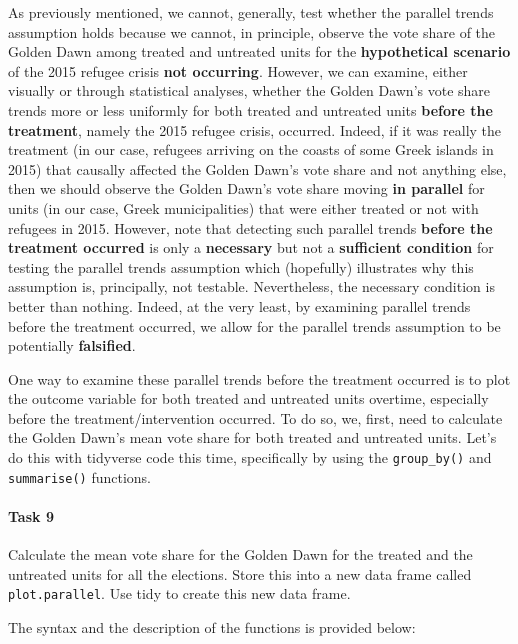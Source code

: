 \documentclass[
]{article}
\begin{document}
As previously mentioned, we cannot, generally, test whether the parallel
trends assumption holds because we cannot, in principle, observe the
vote share of the Golden Dawn among treated and untreated units for the
\textbf{hypothetical scenario} of the 2015 refugee crisis \textbf{not
occurring}. However, we can examine, either visually or through
statistical analyses, whether the Golden Dawn's vote share trends more
or less uniformly for both treated and untreated units \textbf{before
the treatment}, namely the 2015 refugee crisis, occurred. Indeed, if it
was really the treatment (in our case, refugees arriving on the coasts
of some Greek islands in 2015) that causally affected the Golden Dawn's
vote share and not anything else, then we should observe the Golden
Dawn's vote share moving \textbf{in parallel} for units (in our case,
Greek municipalities) that were either treated or not with refugees in
2015. However, note that detecting such parallel trends \textbf{before
the treatment occurred} is only a \textbf{necessary} but not a
\textbf{sufficient condition} for testing the parallel trends assumption
which (hopefully) illustrates why this assumption is, principally, not
testable. Nevertheless, the necessary condition is better than nothing.
Indeed, at the very least, by examining parallel trends before the
treatment occurred, we allow for the parallel trends assumption to be
potentially \textbf{falsified}.

One way to examine these parallel trends before the treatment occurred
is to plot the outcome variable for both treated and untreated units
overtime, especially before the treatment/intervention occurred. To do
so, we, first, need to calculate the Golden Dawn's mean vote share for
both treated and untreated units. Let's do this with tidyverse code this
time, specifically by using the \texttt{group\_by()} and
\texttt{summarise()} functions.

\paragraph{Task 9}\label{task-9}

Calculate the mean vote share for the Golden Dawn for the treated and
the untreated units for all the elections. Store this into a new data
frame called \texttt{plot.parallel}. Use tidy to create this new data
frame.

The syntax and the description of the functions is provided below:
\end{document}
